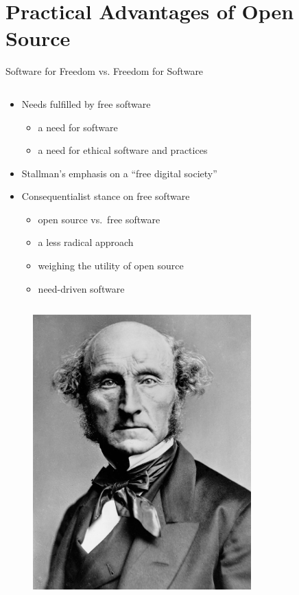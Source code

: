\section{Practical Advantages of Open Source}\frame{\sectionpage}

\begin{frame}{Software for Freedom vs. Freedom for Software}
  \begin{column}{0.6\textwidth}
    \begin{itemize}
      \item Needs fulfilled by free software
        \begin{itemize}
          \item a need for software
          \item a need for ethical software and practices
        \end{itemize}
      \item Stallman's emphasis on a ``free digital society''
      \item Consequentialist stance on free software
        \begin{itemize}
          \item open source vs.\ free software
          \item a less radical approach
          \item weighing the utility of open source
          \item need-driven software~\cite[p. 17]{bisson}
        \end{itemize}
    \end{itemize}
  \end{column}
  \begin{column}{0.4\textwidth}\raggedleft{}
    \begin{figure}
      \includegraphics[width = 0.75\textwidth]{images/mill.jpg}
      \caption{\Protect\cite{mill}}
    \end{figure}
  \end{column}
\end{frame}

